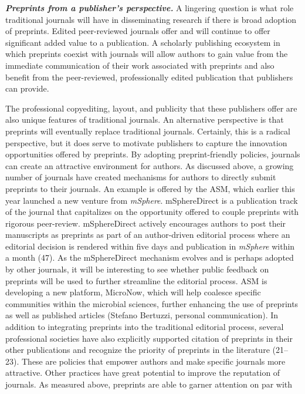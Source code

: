 \documentclass[11pt,]{article}
\begin{document}
\textbf{\emph{Preprints from a publisher's perspective.}} A lingering
question is what role traditional journals will have in disseminating
research if there is broad adoption of preprints. Edited peer-reviewed
journals offer and will continue to offer significant added value to a
publication. A scholarly publishing ecosystem in which preprints coexist
with journals will allow authors to gain value from the immediate
communication of their work associated with preprints and also benefit
from the peer-reviewed, professionally edited publication that
publishers can provide.

The professional copyediting, layout, and publicity that these
publishers offer are also unique features of traditional journals. An
alternative perspective is that preprints will eventually replace
traditional journals. Certainly, this is a radical perspective, but it
does serve to motivate publishers to capture the innovation
opportunities offered by preprints. By adopting preprint-friendly
policies, journals can create an attractive environment for authors. As
discussed above, a growing number of journals have created mechanisms
for authors to directly submit preprints to their journals. An example
is offered by the ASM, which earlier this year launched a new venture
from \emph{mSphere}. mSphereDirect is a publication track of the journal
that capitalizes on the opportunity offered to couple preprints with
rigorous peer-review. mSphereDirect actively encourages authors to post
their manuscripts as preprints as part of an author-driven editorial
process where an editorial decision is rendered within five days and
publication in \emph{mSphere} within a month (47). As the mSphereDirect
mechanism evolves and is perhaps adopted by other journals, it will be
interesting to see whether public feedback on preprints will be used to
further streamline the editorial process. ASM is developing a new
platform, MicroNow, which will help coalesce specific communities within
the microbial sciences, further enhancing the use of preprints as well
as published articles (Stefano Bertuzzi, personal communication). In
addition to integrating preprints into the traditional editorial
process, several professional societies have also explicitly supported
citation of preprints in their other publications and recognize the
priority of preprints in the literature (21--23). These are policies
that empower authors and make specific journals more attractive. Other
practices have great potential to improve the reputation of journals. As
measured above, preprints are able to garner attention on par with
\end{document}

